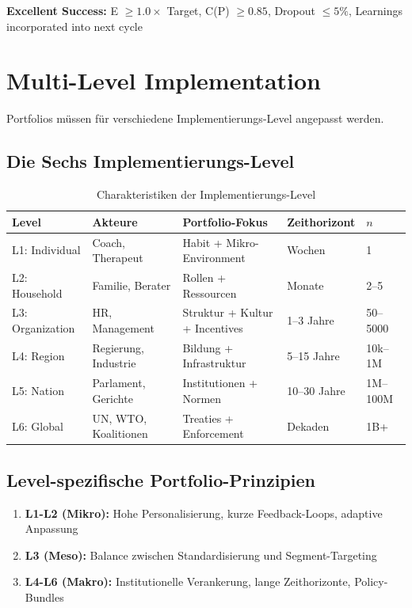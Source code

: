 \textbf{Excellent Success:} E $\geq 1.0 \times$ Target, C(P) $\geq 0.85$, Dropout $\leq 5\%$, Learnings incorporated into next cycle

\section{Multi-Level Implementation}
\label{sec:20-levels}

Portfolios müssen für verschiedene Implementierungs-Level angepasst werden.

\subsection{Die Sechs Implementierungs-Level}

\begin{table}[htbp]
\centering
\caption{Charakteristiken der Implementierungs-Level}
\label{tab:20-levels}
\renewcommand{\arraystretch}{1.4}
\small
\begin{tabular}{@{}lllll@{}}
\toprule
\textbf{Level} & \textbf{Akteure} & \textbf{Portfolio-Fokus} & \textbf{Zeithorizont} & \textbf{$n$} \\
\midrule
L1: Individual & Coach, Therapeut & Habit + Mikro-Environment & Wochen & 1 \\
L2: Household & Familie, Berater & Rollen + Ressourcen & Monate & 2--5 \\
L3: Organization & HR, Management & Struktur + Kultur + Incentives & 1--3 Jahre & 50--5000 \\
L4: Region & Regierung, Industrie & Bildung + Infrastruktur & 5--15 Jahre & 10k--1M \\
L5: Nation & Parlament, Gerichte & Institutionen + Normen & 10--30 Jahre & 1M--100M \\
L6: Global & UN, WTO, Koalitionen & Treaties + Enforcement & Dekaden & 1B+ \\
\bottomrule
\end{tabular}
\end{table}

\subsection{Level-spezifische Portfolio-Prinzipien}

\begin{enumerate}
\item \textbf{L1-L2 (Mikro):} Hohe Personalisierung, kurze Feedback-Loops, adaptive Anpassung
\item \textbf{L3 (Meso):} Balance zwischen Standardisierung und Segment-Targeting
\item \textbf{L4-L6 (Makro):} Institutionelle Verankerung, lange Zeithorizonte, Policy-Bundles
\end{enumerate}

